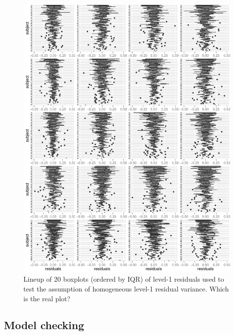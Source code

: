 \documentclass{article} %
\begin{document}
\begin{figure}
	\centering
	\includegraphics[width=\textwidth]{ahd_goodcyclone13.pdf}
	\caption{\label{fig:goodcyclone} Lineup of 20 boxplots (ordered by IQR) of level-1 residuals used to test the assumption of homogeneous level-1 residual variance.  Which is the real plot?}
\end{figure}


\subsection{Model checking}
\end{document}
